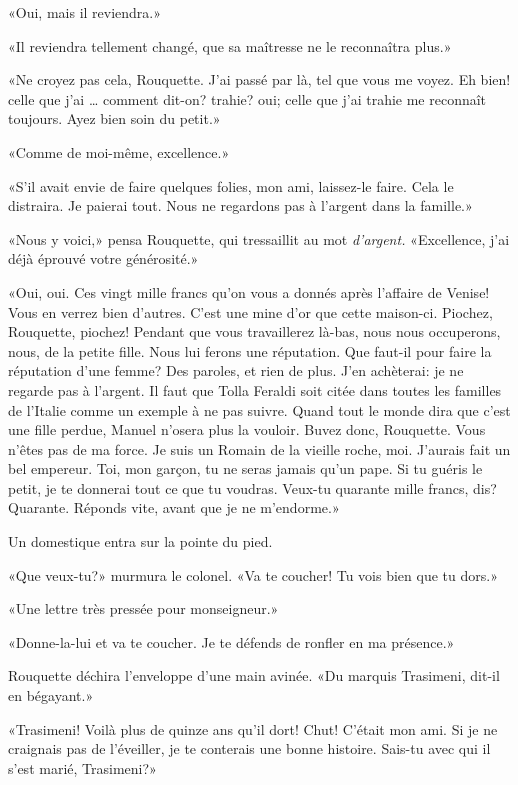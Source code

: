 «Oui, mais il reviendra.»

«Il reviendra tellement changé, que sa maîtresse ne le reconnaîtra plus.»

«Ne croyez pas cela, Rouquette. J'ai passé par là, tel que vous me voyez. Eh bien! celle que j'ai \ldots{} comment dit-on? trahie? oui; celle que j'ai trahie me reconnaît toujours. Ayez bien soin du petit.»

«Comme de moi-même, excellence.»

«S'il avait envie de faire quelques folies, mon ami, laissez-le faire. Cela le distraira. Je paierai tout. Nous ne regardons pas à l'argent dans la famille.»

«Nous y voici,» pensa Rouquette, qui tressaillit au mot \emph{d'argent.} «Excellence, j'ai déjà éprouvé votre générosité.»

«Oui, oui. Ces vingt mille francs qu'on vous a donnés après l'affaire de Venise! Vous en verrez bien d'autres. C'est une mine d'or que cette maison-ci. Piochez, Rouquette, piochez! Pendant que vous travaillerez là-bas, nous nous occuperons, nous, de la petite fille. Nous lui ferons une réputation. Que faut-il pour faire la réputation d'une femme? Des paroles, et rien de plus. J'en achèterai: je ne regarde pas à l'argent. Il faut que Tolla Feraldi soit citée dans toutes les familles de l'Italie comme un exemple à ne pas suivre. Quand tout le monde dira que c'est une fille perdue, Manuel n'osera plus la vouloir. Buvez donc, Rouquette. Vous n'êtes pas de ma force. Je suis un Romain de la vieille roche, moi. J'aurais fait un bel empereur. Toi, mon garçon, tu ne seras jamais qu'un pape. Si tu guéris le petit, je te donnerai tout ce que tu voudras. Veux-tu quarante mille francs, dis? Quarante. Réponds vite, avant que je ne m'endorme.»

Un domestique entra sur la pointe du pied.

«Que veux-tu?» murmura le colonel. «Va te coucher! Tu vois bien que tu dors.»

«Une lettre très pressée pour monseigneur.»

«Donne-la-lui et va te coucher. Je te défends de ronfler en ma présence.»

Rouquette déchira l'enveloppe d'une main avinée. «Du marquis Trasimeni, dit-il en bégayant.»

«Trasimeni! Voilà plus de quinze ans qu'il dort! Chut! C'était mon ami. Si je ne craignais pas de l'éveiller, je te conterais une bonne histoire. Sais-tu avec qui il s'est marié, Trasimeni?»

